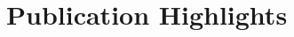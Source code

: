 \documentclass[10pt,a4paper]{article}
\newcommand{\LastName}{Williams II}
\newcommand{\Initials}{DA}
\newcommand{\Me}{\underline{\LastName, \Initials}}  %
\newcommand{\Year}[1]{\fontsize{10pt}{0}\selectfont \texttt{#1}}
\newcommand{\GitHub}[1]{GitHub: \href{https://github.com/#1}{#1}}
\begin{document}

\section{Publication Highlights}
\end{document}

